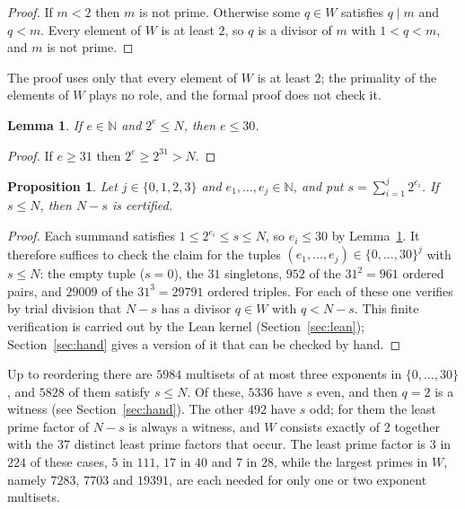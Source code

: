 \documentclass[11pt]{amsart}
\theoremstyle{plain}
\newtheorem{lemma}[theorem]{Lemma}
\newtheorem{proposition}[theorem]{Proposition}
\theoremstyle{definition}
\newcommand{\N}{\mathbb{N}}
\begin{document}
\begin{proof}
If $m<2$ then $m$ is not prime. Otherwise some $q\in W$ satisfies $q\mid m$ and $q<m$. Every element of $W$ is at least $2$, so $q$ is a divisor of $m$ with $1<q<m$, and $m$ is not prime.
\end{proof}

The proof uses only that every element of $W$ is at least $2$; the primality of the elements of $W$ plays no role, and the formal proof does not check it.

\begin{lemma}\label{lem:exp}
If $e\in\N$ and $2^e\le N$, then $e\le 30$.
\end{lemma}

\begin{proof}
If $e\ge 31$ then $2^e\ge 2^{31}>N$.
\end{proof}

\begin{proposition}\label{prop:finite}
Let $j\in\{0,1,2,3\}$ and $e_1,\dots,e_j\in\N$, and put $s=\sum_{i=1}^j 2^{e_i}$. If $s\le N$, then $N-s$ is certified.
\end{proposition}

\begin{proof}
Each summand satisfies $1\le 2^{e_i}\le s\le N$, so $e_i\le 30$ by Lemma~\ref{lem:exp}. It therefore suffices to check the claim for the tuples $(e_1,\dots,e_j)\in\{0,\dots,30\}^j$ with $s\le N$: the empty tuple ($s=0$), the $31$ singletons, $952$ of the $31^2=961$ ordered pairs, and $29009$ of the $31^3=29791$ ordered triples. For each of these one verifies by trial division that $N-s$ has a divisor $q\in W$ with $q<N-s$. This finite verification is carried out by the Lean kernel (Section~\ref{sec:lean}); Section~\ref{sec:hand} gives a version of it that can be checked by hand.
\end{proof}

Up to reordering there are $5984$ multisets of at most three exponents in $\{0,\dots,30\}$, and $5828$ of them satisfy $s\le N$.
Of these, $5336$ have $s$ even, and then $q=2$ is a witness (see Section~\ref{sec:hand}).
The other $492$ have $s$ odd; for them the least prime factor of $N-s$ is always a witness, and $W$ consists exactly of $2$ together with the $37$ distinct least prime factors that occur.
The least prime factor is $3$ in $224$ of these cases, $5$ in $111$, $17$ in $40$ and $7$ in $28$, while the largest primes in $W$, namely $7283$, $7703$ and $19391$, are each needed for only one or two exponent multisets.
\end{document}
